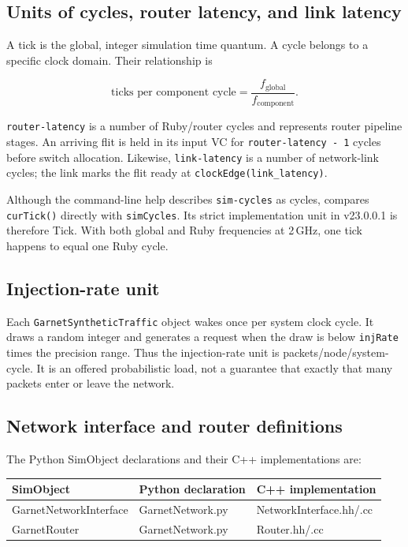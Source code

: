\documentclass[11pt,a4paper]{article}
\newcommand{\code}[1]{\texttt{#1}}
\begin{document}
\subsection{Units of cycles, router latency, and link latency}

A tick is the global, integer simulation time quantum. A cycle belongs to a
specific clock domain. Their relationship is

\begin{equation}
\text{ticks per component cycle}
=\frac{f_{\mathrm{global}}}{f_{\mathrm{component}}}.
\end{equation}

\code{router-latency} is a number of Ruby/router cycles and represents router
pipeline stages. An arriving flit is held in its input VC for
\code{router-latency - 1} cycles before switch allocation. Likewise,
\code{link-latency} is a number of network-link cycles; the link marks the flit
ready at \code{clockEdge(link\_latency)}.

Although the command-line help describes \code{sim-cycles} as cycles,
 compares \code{curTick()} directly with
\code{simCycles}. Its strict implementation unit in v23.0.0.1 is therefore
Tick. With both global and Ruby frequencies at 2\,GHz, one tick happens to equal
one Ruby cycle.

\subsection{Injection-rate unit}

Each \code{GarnetSyntheticTraffic} object wakes once per system clock cycle. It
draws a random integer and generates a request when the draw is below
\code{injRate} times the precision range. Thus the injection-rate unit is
packets/node/system-cycle. It is an offered probabilistic load, not a guarantee
that exactly that many packets enter or leave the network.

\subsection{Network interface and router definitions}

The Python SimObject declarations and their C++ implementations are:

\begin{table}[h]
\centering
\begin{tabular}{lll}
\toprule
SimObject & Python declaration & C++ implementation \\
\midrule
GarnetNetworkInterface & GarnetNetwork.py & NetworkInterface.hh/.cc \\
GarnetRouter & GarnetNetwork.py & Router.hh/.cc \\
\bottomrule
\end{tabular}
\end{table}
\end{document}
